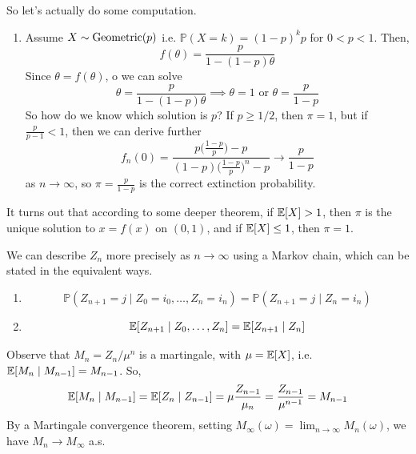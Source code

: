 \begin{example}
    So let's actually do some computation. 
    \begin{enumerate}
      \item Assume $X \sim \operatorname{Geometric}(p)$ i.e. $\mathbb{P}(X = k) = (1 - p)^k p$ for $0 < p < 1$. Then, 
        \begin{equation}
          f(\theta) = \frac{p}{1 - (1 - p)\theta} 
        \end{equation}
        Since $\theta = f (\theta)$, o we can solve 
        \begin{equation}
          \theta = \frac{p}{1 - (1 - p) \theta} \implies \theta = 1 \text{ or } \theta = \frac{p}{1 - p}
        \end{equation}
        So how do we know which solution is $p$? If $p \geq 1/2$, then $\pi = 1$, but if $\frac{p}{p - 1} < 1$, then we can derive further 
        \begin{equation}
          f_n (0) = \frac{p \big(\frac{1 - p}{p} \big) - p}{(1 - p) \big( \frac{1 - p}{p} \big)^n - p} \to \frac{p}{1 - p}
        \end{equation}
        as $n \to \infty$, so $\pi = \frac{p}{1 - p}$ is the correct extinction probability. 
    \end{enumerate}
    It turns out that according to some deeper theorem, if $\operatorname{\mathbb{E}}[X] > 1$, then $\pi$ is the unique solution to $x = f(x)$ on $(0, 1)$, and if $\operatorname{\mathbb{E}}[X] \leq 1$, then $\pi = 1$. 
  \end{example}

  \begin{example}
    \label{ex:branching-process-as-a-markov-chain}
    We can describe $Z_n$ more precisely as $n \to \infty$ using a Markov chain, which can be stated in the equivalent ways. 
    \begin{enumerate}
      \item 
        \begin{equation}
          \mathbb{P}(Z_{n+1} = j \mid Z_0 = i_0, \ldots, Z_n = i_n) = \mathbb{P}(Z_{n+1} = j \mid Z_n = i_n)
        \end{equation} 

      \item 
        \begin{equation}
          \operatorname{\mathbb{E}}[Z_{n+1} \mid Z_0, \ldots, Z_n] = \operatorname{\mathbb{E}}[Z_{n+1} \mid Z_n] 
        \end{equation}
    \end{enumerate}

    Observe that $M_n = Z_n / \mu^n$ is a martingale, with $\mu = \operatorname{\mathbb{E}}[X]$, i.e. $\operatorname{\mathbb{E}}[M_n \mid M_{n-1}] = M_{n-1}$. So, 
    \begin{equation}
      \operatorname{\mathbb{E}}[M_n \mid M_{n-1}] = \operatorname{\mathbb{E}}[Z_n \mid Z_{n-1}] = \mu \frac{Z_{n-1}}{\mu_n} = \frac{Z_{n-1}}{\mu^{n-1}} = M_{n-1}
    \end{equation}
    By a Martingale convergence theorem, setting $M_\infty (\omega) = \lim_{n \to \infty} M_n (\omega)$, we have $M_n \to M_\infty$ a.s. 
  \end{example}


